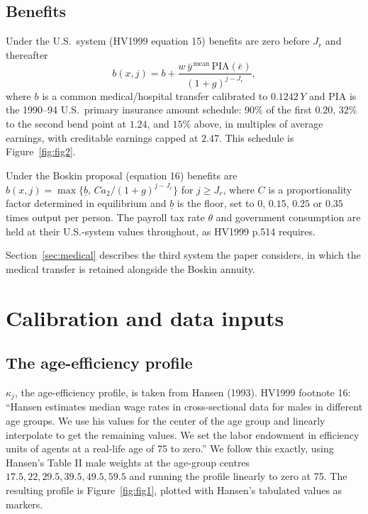 \documentclass[11pt,fleqn]{article}
\begin{document}
\subsection*{Benefits}

Under the U.S.\ system (HV1999 equation 15) benefits are zero before $J_r$ and thereafter
\begin{equation*}
 b(x,j) = b + \frac{w\,\bar{y}^{\,\text{mean}}\,\mathrm{PIA}(\bar{e})}{(1+g)^{j-J_r}},
\end{equation*}
where $b$ is a common medical/hospital transfer calibrated to $0.1242\,Y$ and
$\mathrm{PIA}$ is the 1990--94 U.S.\ primary insurance amount schedule: $90\%$ of the first
$0.20$, $32\%$ to the second bend point at $1.24$, and $15\%$ above, in multiples of average
earnings, with creditable earnings capped at $2.47$. This schedule is Figure~\ref{fig:fig2}.

Under the Boskin proposal (equation 16) benefits are
$b(x,j)=\max\{\underline{b},\,C a_2/(1+g)^{j-J_r}\}$ for $j\ge J_r$, where $C$ is a
proportionality factor determined in equilibrium and $\underline{b}$ is the floor, set to
$0$, $0.15$, $0.25$ or $0.35$ times output per person. The payroll tax rate $\theta$ and
government consumption are held at their U.S.-system values throughout, as HV1999 p.514
requires.

Section~\ref{sec:medical} describes the third system the paper considers, in which the
medical transfer is retained alongside the Boskin annuity.

\section{Calibration and data inputs}\label{sec:calib}

\subsection*{The age-efficiency profile}

$\kappa_j$, the age-efficiency profile, is taken from Hansen (1993). HV1999 footnote 16: ``Hansen estimates median wage
rates in cross-sectional data for males in different age groups. We use his values for the
center of the age group and linearly interpolate to get the remaining values. We set the
labor endowment in efficiency units of agents at a real-life age of 75 to zero.'' We follow
this exactly, using Hansen's Table II male weights at the age-group centres
$17.5, 22, 29.5, 39.5, 49.5, 59.5$ and running the profile linearly to zero at 75. The
resulting profile is Figure~\ref{fig:fig1}, plotted with Hansen's tabulated values as markers.
\end{document}
